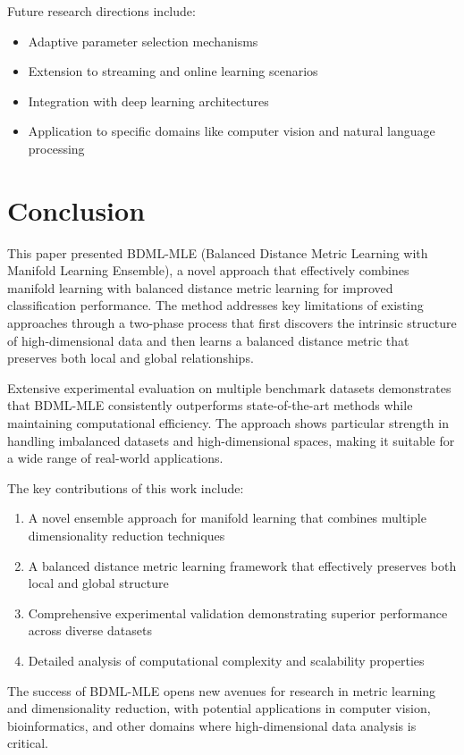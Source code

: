 \documentclass[review]{elsarticle}
\begin{document}
Future research directions include:
\begin{itemize}
\item Adaptive parameter selection mechanisms
\item Extension to streaming and online learning scenarios
\item Integration with deep learning architectures
\item Application to specific domains like computer vision and natural language processing
\end{itemize}

\section{Conclusion}

This paper presented BDML-MLE (Balanced Distance Metric Learning with Manifold Learning Ensemble), a novel approach that effectively combines manifold learning with balanced distance metric learning for improved classification performance. The method addresses key limitations of existing approaches through a two-phase process that first discovers the intrinsic structure of high-dimensional data and then learns a balanced distance metric that preserves both local and global relationships.

Extensive experimental evaluation on multiple benchmark datasets demonstrates that BDML-MLE consistently outperforms state-of-the-art methods while maintaining computational efficiency. The approach shows particular strength in handling imbalanced datasets and high-dimensional spaces, making it suitable for a wide range of real-world applications.

The key contributions of this work include:
\begin{enumerate}
\item A novel ensemble approach for manifold learning that combines multiple dimensionality reduction techniques
\item A balanced distance metric learning framework that effectively preserves both local and global structure
\item Comprehensive experimental validation demonstrating superior performance across diverse datasets
\item Detailed analysis of computational complexity and scalability properties
\end{enumerate}

The success of BDML-MLE opens new avenues for research in metric learning and dimensionality reduction, with potential applications in computer vision, bioinformatics, and other domains where high-dimensional data analysis is critical.
\end{document}
